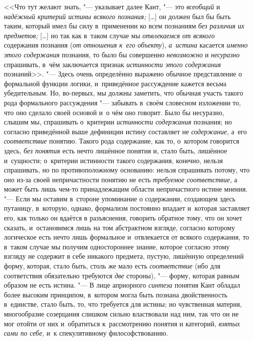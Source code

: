 <<Что тут желают знать, "--- указывает далее Кант,
"--- это {\em всеобщий} и {\em надёжный критерий
истины всякого познания;} [\ldots] он должен был бы быть таким,
который имел бы силу в~применении ко всем познаниям
{\em без различия их предметов;} [\ldots] но так как в~таком случае мы
{\em отвлекаемся от всякого} содержания познания
({\em от отношения к~его объекту}), {\em а~истина} касается
{\em именно этого содержания} познания, то было бы совершенно
{\em невозможно} и {\em несуразно} спрашивать, в~чём заключается признак
{\em истинности этого содержания} познаний>>.
"--- Здесь очень определённо выражено обычное представление о
формальной функции логики, и~приведённое рассуждение кажется весьма
убедительным. Но, во-первых, мы должны заметить, что обычная участь такого
рода формального рассуждения "--- забывать в~своём словесном
изложении то, что оно сделало своей основой и~о чём оно говорит. Было бы
несуразно, слышим мы, спрашивать о~критерии {\em истинности содержания}
познания; но согласно приведённой выше дефиниции истину
составляет не {\em содержание,} а~его {\em соответствие}
понятию. Такого рода содержание, как то, о~котором говорится
здесь, {\em без понятия} есть нечто лишённое понятия и, стало быть,
лишённое и~сущности; о~критерии истинности такого содержания, конечно,
нельзя спрашивать, но по противоположному основанию: нельзя спрашивать
потому, что оно из-за своей непричастности понятию не есть
{\em требуемое соответствие,}
а может быть лишь чем-то принадлежащим области непричастного
истине мнения. "--- Если мы оставим в~стороне упоминание о
содержании, создающем здесь путаницу, в~которую, однако, формализм
постоянно впадает и~которая заставляет его, как только он вдаётся в
разъяснения, говорить обратное тому, что он хочет сказать, и~остановимся
лишь на том абстрактном взгляде, согласно которому логическое есть нечто
лишь формальное и~отвлекается от всякого содержания, то в~таком случае мы
получим одностороннее знание, которое согласно этому взгляду не содержит в
себе никакого предмета, пустую, лишённую определений форму, которая, стало
быть, столь же мало есть {\em соответствие} (ибо
для соответствия обязательно требуются {\em две} стороны), "---
форму, которая равным образом не есть истина. "---
В лице априорного {\em синтеза} понятия
Кант обладал более высоким принципом, в~котором могла быть познана
двойственность в~единстве, стало быть, то, что требуется для истины; но
чувственная материя, многообразие созерцания слишком сильно властвовали над
ним, так что он не мог отойти от них и~обратиться к~рассмотрению понятия и
категорий, {\em взятых сами по себе,} и~к спекулятивному философствованию.

